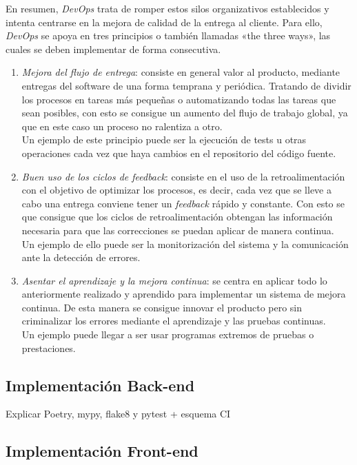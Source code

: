 En resumen, \textit{DevOps} trata de romper estos silos organizativos establecidos y intenta centrarse en la mejora de calidad de la entrega al cliente. Para ello, \textit{DevOps} se apoya en tres principios o también llamadas «the three ways», las cuales se deben implementar de forma consecutiva. \cite{ilimit-devops}

\begin{enumerate}
    \item\textit{Mejora del flujo de entrega}: consiste en general valor al producto, mediante entregas del software de una forma temprana y periódica. Tratando de dividir los procesos en tareas más pequeñas o automatizando todas las tareas que sean posibles, con esto se consigue un aumento del flujo de trabajo global, ya que en este caso un proceso no ralentiza a otro. \\
    Un ejemplo de este principio puede ser la ejecución de tests u otras operaciones cada vez que haya cambios en el repositorio del código fuente.
    \item\textit{Buen uso de los ciclos de feedback}: consiste en el uso de la retroalimentación con el objetivo de optimizar los procesos, es decir, cada vez que se lleve a cabo una entrega conviene tener un \textit{feedback} rápido y constante. Con esto se que consigue que los ciclos de retroalimentación obtengan las información necesaria para que las correcciones se puedan aplicar de manera continua. \\
    Un ejemplo de ello puede ser la monitorización del sistema y la comunicación ante la detección de errores.
    \item\textit{Asentar el aprendizaje y la mejora continua}: se centra en aplicar todo lo anteriormente realizado y aprendido para implementar un sistema de mejora continua. De esta manera se consigue innovar el producto pero sin criminalizar los errores mediante el aprendizaje y las pruebas continuas. \\
    Un ejemplo puede llegar a ser usar programas extremos de pruebas o prestaciones.
\end{enumerate}

\subsection{Implementación Back-end}

Explicar Poetry, mypy, flake8 y pytest + esquema CI

\subsection{Implementación Front-end}